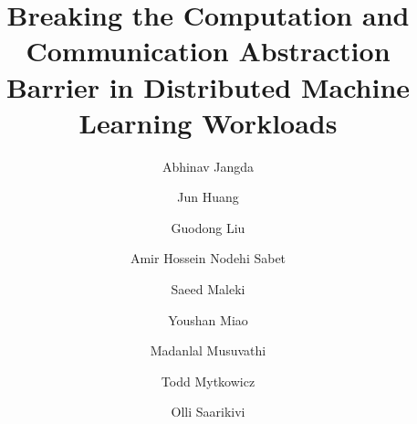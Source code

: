 \documentclass[sigconf,screen]{acmart}
\begin{document}

\date{}

\title[Breaking the Computation and Communication Abstraction Barrier in Distributed ML Workloads]{Breaking the Computation and Communication Abstraction Barrier in Distributed Machine Learning Workloads}

\author{Abhinav Jangda}
\author{Jun Huang}
\author{Guodong Liu}
\author{Amir Hossein Nodehi Sabet}
\author{Saeed Maleki}
\author{Youshan Miao}
\author{Madanlal Musuvathi}
\author{Todd Mytkowicz}
\author{Olli Saarikivi}

\renewcommand{\shortauthors}{A. Jangda, J. Huang, G. Liu, A. H. N. Sabet, S. Maleki, Y. Miao, M. Musuvathi, T. Mytkowicz, O. Sarikivi}


\end{document}
